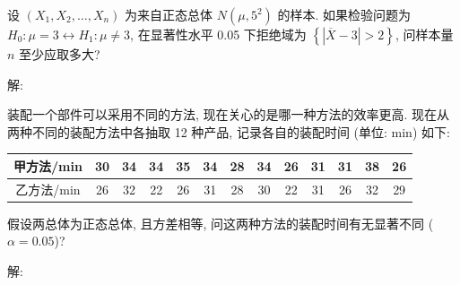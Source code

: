 \documentclass[standard]{ExBook}
\begin{document}
\begin{qitems}
\vspace{-5em}

    \begin{bbox}
    \begin{shaded}
        \qitem
设 $(X_1, X_2, \ldots, X_n)$ 为来自正态总体 $N(\mu, 5^2)$ 的样本. 如果检验问题为 $H_0 : \mu = 3 \longleftrightarrow H_1 : \mu \neq 3$, 在显著性水平 0.05 下拒绝域为 $\left\{|\overline{X} - 3| > 2\right\}$, 问样本量 $n$ 至少应取多大?
    \end{shaded}
    \end{bbox}

\vspace{-5em}

    \begin{bbox}
解: 
    \end{bbox}

\vspace{-5em}

    \begin{bbox}
    \begin{shaded}
        \qitem
装配一个部件可以采用不同的方法, 现在关心的是哪一种方法的效率更高. 现在从两种不同的装配方法中各抽取 12 种产品, 记录各自的装配时间 (单位: min) 如下:
\begin{center}
\setlength{\tabcolsep}{11pt}
\begin{tabular}{c|cccccccccccc}
\hline
甲方法/min & 30 & 34 & 34 & 35 & 34 & 28 & 34 & 26 & 31 & 31 & 38 & 26 \\
\hline
乙方法/min & 26 & 32 & 22 & 26 & 31 & 28 & 30 & 22 & 31 & 26 & 32 & 29 \\
\hline
\end{tabular}
\end{center}
假设两总体为正态总体, 且方差相等, 问这两种方法的装配时间有无显著不同 ($\alpha=0.05$)?
    \end{shaded}
    \end{bbox}

\vspace{-5em}

    \begin{bbox}
解: 
    \end{bbox}

\vspace{-5em}


\end{qitems}
\end{document}
